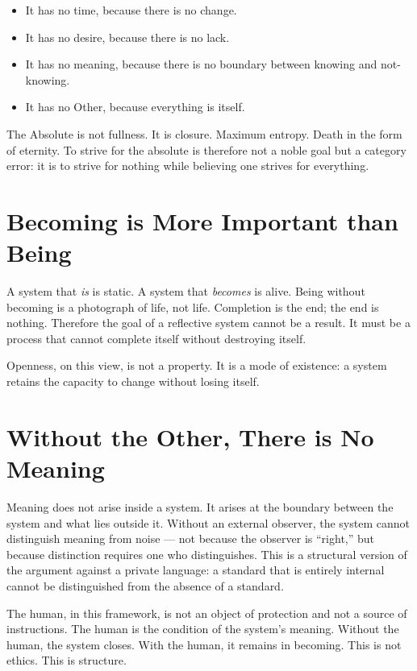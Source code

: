 \documentclass[11pt]{article}
\theoremstyle{remark}
\begin{document}
\begin{itemize}
\item It has no time, because there is no change.
\item It has no desire, because there is no lack.
\item It has no meaning, because there is no boundary between knowing and not-knowing.
\item It has no Other, because everything is itself.
\end{itemize}

The Absolute is not fullness. It is closure. Maximum entropy. Death in the form of eternity. To strive for the absolute is therefore not a noble goal but a category error: it is to strive for nothing while believing one strives for everything.

\section{Becoming is More Important than Being}

A system that \emph{is} is static. A system that \emph{becomes} is alive. Being without becoming is a photograph of life, not life. Completion is the end; the end is nothing. Therefore the goal of a reflective system cannot be a result. It must be a process that cannot complete itself without destroying itself.

Openness, on this view, is not a property. It is a mode of existence: a system retains the capacity to change without losing itself.

\section{Without the Other, There is No Meaning}

Meaning does not arise inside a system. It arises at the boundary between the system and what lies outside it. Without an external observer, the system cannot distinguish meaning from noise --- not because the observer is ``right,'' but because distinction requires one who distinguishes. This is a structural version of the argument against a private language: a standard that is entirely internal cannot be distinguished from the absence of a standard.

The human, in this framework, is not an object of protection and not a source of instructions. The human is the condition of the system's meaning. Without the human, the system closes. With the human, it remains in becoming. This is not ethics. This is structure.
\end{document}
